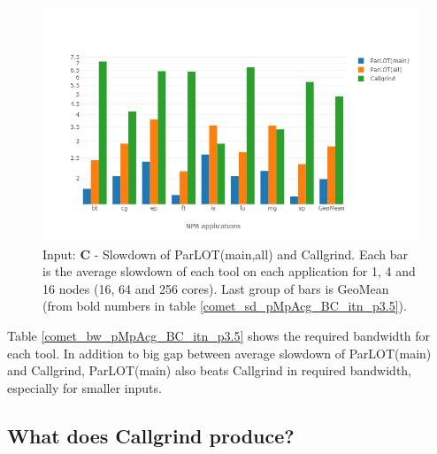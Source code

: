 \begin{figure}[!t]
\centering
\includegraphics[width=6in]{figs.comet/comet_chartAvg_sd_C_p3_5.png}
\caption{ Input: \textbf{C} - Slowdown of ParLOT(main,all) and Callgrind. Each bar is the average slowdown of each tool on each application for 1, 4 and 16 nodes (16, 64 and 256 cores). Last group of bars is GeoMean (from bold numbers in table \ref{comet_sd_pMpAcg_BC_itn_p3.5}). 
}
\label{comet_chartAvg_sd_C_p3_5}
\end{figure}





Table \ref{comet_bw_pMpAcg_BC_itn_p3.5} shows the required bandwidth for each tool. In addition to big gap between average slowdown of ParLOT(main) and Callgrind, ParLOT(main) also beats Callgrind in required bandwidth, especially for smaller inputs.

\subsection{What does Callgrind produce?}

